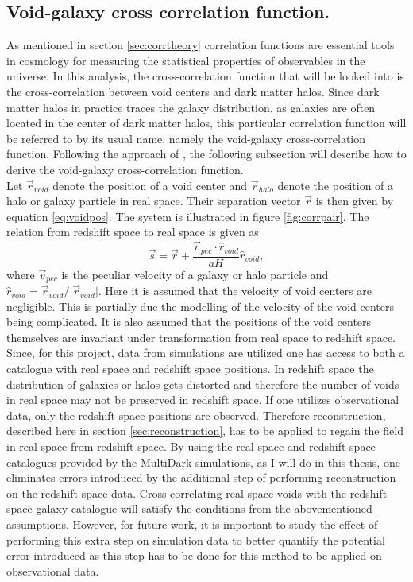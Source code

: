\subsection{Void-galaxy cross correlation function.}\label{sec:vgcrosscorr}
As mentioned in section \ref{sec:corrtheory} correlation functions are
essential tools in cosmology for measuring the statistical properties of
observables in the universe. In this analysis, the cross-correlation function that
will be looked into is the cross-correlation between void centers and dark matter halos. Since dark matter halos in practice traces the galaxy distribution, as galaxies are often located in the center of dark matter halos, this particular correlation function will be referred to by its usual name, namely the void-galaxy cross-correlation function. Following the approach of \cite{Nadathur_corr}, the following
subsection will describe how to derive the void-galaxy cross-correlation
function. 
\\\indent
Let $\vec{r}_{void}$ denote the position of a void center and $\vec{r}_{halo}$ denote the
position of a halo or galaxy particle in real space. Their separation vector $\vec{r}$ is then
given by equation \ref{eq:voidpos}. The system is illustrated in figure \ref{fig:corrpair}. The relation from redshift space to real space
is given as
\begin{equation}\label{eq:s_to_r}
    \vec{s}=\vec{r}+\frac{\vec{v}_{pec}\cdot\hat{r}_{void}}{aH}\hat{r}_{void},
\end{equation}
where $\vec{v}_{pec}$ is the peculiar velocity of a galaxy or halo particle and
$\hat{r}_{void}=\vec{r}_{void}/ \vert \vec{r}_{void}\vert$. Here it is assumed
that the velocity of void centers are negligible. This is partially due the modelling of the velocity of the void centers being complicated. It is also assumed that the positions of the void centers themselves are invariant under transformation from real space to redshift space.  Since, for this project, data from simulations are utilized one has access to both a catalogue with real space and redshift space positions.
In redshift space the distribution of galaxies or halos gets distorted and therefore the number of voids in
real space may not be preserved in redshift space. If one utilizes observational data, only the redshift space positions are observed. Therefore reconstruction,
described here in section \ref{sec:reconstruction}, has to be applied to regain
the field in real space from redshift space. By using the real space and redshift space catalogues provided by the MultiDark simulations\cite{Multidark_dataset}, as I will do in this thesis, one eliminates errors introduced by the additional step of performing reconstruction on the redshift space data. Cross correlating real space voids with the redshift space galaxy catalogue will satisfy the conditions from the abovementioned assumptions. However, for future work, it is important to study the effect of performing this extra step on simulation data to better quantify the potential error introduced as this step has to be done for this method to be applied on observational data.\\\indent
